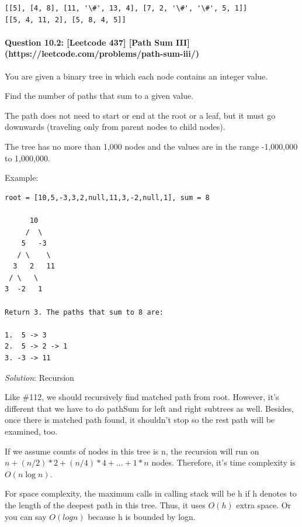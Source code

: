 \documentclass[11pt]{article}
\begin{document}
    \begin{Verbatim}[commandchars=\\\{\}]
[[5], [4, 8], [11, '\#', 13, 4], [7, 2, '\#', '\#', 5, 1]]
[[5, 4, 11, 2], [5, 8, 4, 5]]

    \end{Verbatim}

    \paragraph{Question 10.2: {[}Leetcode 437{]} {[}Path Sum
III{]}(https://leetcode.com/problems/path-sum-iii/)}\label{question-10.2-leetcode-437-path-sum-iiihttpsleetcode.comproblemspath-sum-iii}

You are given a binary tree in which each node contains an integer
value.

Find the number of paths that sum to a given value.

The path does not need to start or end at the root or a leaf, but it
must go downwards (traveling only from parent nodes to child nodes).

The tree has no more than 1,000 nodes and the values are in the range
-1,000,000 to 1,000,000.

Example:

\begin{verbatim}
root = [10,5,-3,3,2,null,11,3,-2,null,1], sum = 8

      10
     /  \
    5   -3
   / \    \
  3   2   11
 / \   \
3  -2   1

Return 3. The paths that sum to 8 are:

1.  5 -> 3
2.  5 -> 2 -> 1
3. -3 -> 11
\end{verbatim}

    \emph{Solution}: Recursion

Like \#112, we should recursively find matched path from root. However,
it's different that we have to do pathSum for left and right subtrees as
well. Besides, once there is matched path found, it shouldn't stop so
the rest path will be examined, too.

If we assume counts of nodes in this tree is n, the recursion will run
on \(n + (n/2)*2 + (n/4)*4 + … + 1*n\) nodes. Therefore, it's time
complexity is \(O(n\log{n})\).

For space complexity, the maximum calls in calling stack will be h if h
denotes to the length of the deepest path in this tree. Thus, it uses
\(O(h)\) extra space. Or you can say \(O(logn)\) because h is bounded by
logn.
\end{document}
